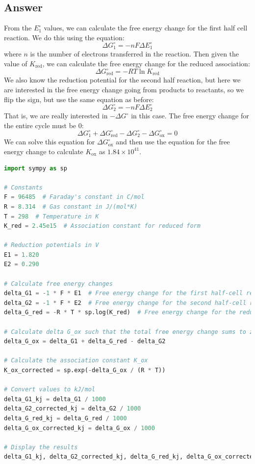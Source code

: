 \documentclass[12pt]{article}
\begin{document}
\subsection{Answer}
From the $E^{\circ}_1$ values, we can calculate the free energy change for the first half cell reaction. We do this using the equation:
\begin{equation}
\Delta G^{\circ}_{1}=-n F \Delta E^{\circ}_1
\end{equation}
where $n$ is the number of electrons transferred in the reaction. Then given the value of $K_{\text{red}}$, we can calculate the free energy change for the reduced association:
\begin{equation}
\Delta G^{\circ}_{\text{red}}=-RT \ln K_{\text{red}}
\end{equation}
We also know the reduction potential for the second half reaction, but here we are interested in the free energy change going from products to reactants, so we flip the sign, but use the same equation as before:
\begin{equation}
\Delta G^{\circ}_2=-n F \Delta E^{\circ}_2
\end{equation}
That is, we are really interested in $- \Delta G^{\circ}$ in this case. The free energy change for the entire cycle must be 0:
\begin{equation}
\Delta G^{\circ}_{1}+\Delta G^{\circ}_{\text{red}}-\Delta G^{\circ}_2-\Delta G^{\circ}_{\text{ox}}=0
\end{equation}
We can solve this equation for $\Delta G^{\circ}_{\text{ox}}$ and then use the equation for the free energy change to calculate $K_{\text{ox}}$ as $1.84 \times 10^{41}$.
\begin{lstlisting}[language=Python]
import sympy as sp

# Constants
F = 96485  # Faraday's constant in C/mol
R = 8.314  # Gas constant in J/(mol*K)
T = 298  # Temperature in K
K_red = 2.45e15  # Association constant for reduced form

# Reduction potentials in V
E1 = 1.820
E2 = 0.290

# Calculate free energy changes
delta_G1 = -1 * F * E1  # Free energy change for the first half-cell reaction
delta_G2 = -1 * F * E2  # Free energy change for the second half-cell reaction with sign flipped
delta_G_red = -R * T * sp.log(K_red)  # Free energy change for the reduced association

# Calculate delta G_ox such that the total free energy change sums to zero
delta_G_ox = delta_G1 + delta_G_red - delta_G2

# Calculate the association constant K_ox
K_ox_corrected = sp.exp(-delta_G_ox / (R * T))

# Convert values to kJ/mol
delta_G1_kj = delta_G1 / 1000
delta_G2_corrected_kj = delta_G2 / 1000
delta_G_red_kj = delta_G_red / 1000
delta_G_ox_corrected_kj = delta_G_ox / 1000

# Display the results
delta_G1_kj, delta_G2_corrected_kj, delta_G_red_kj, delta_G_ox_corrected_kj, K_ox_corrected.evalf()

\end{lstlisting}
\end{document}
